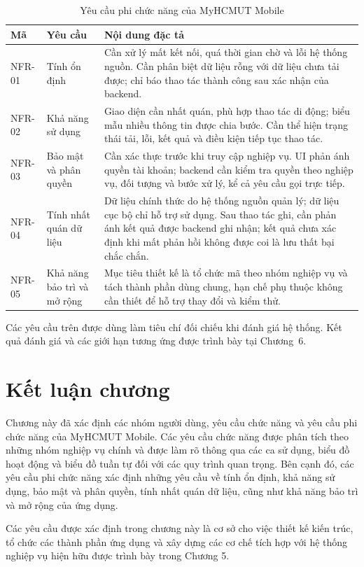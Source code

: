 \begin{table}[H]
\centering\small
\caption{Yêu cầu phi chức năng của MyHCMUT Mobile}
\label{tab:nfr}
\begin{tabularx}{\textwidth}{|L{1.8cm}|L{3.4cm}|Y|}
\hline
\textbf{Mã} & \textbf{Yêu cầu} & \textbf{Nội dung đặc tả} \\
\hline
NFR-01 & Tính ổn định & Cần xử lý mất kết nối, quá thời gian chờ và lỗi hệ thống nguồn. Cần phân biệt dữ liệu rỗng với dữ liệu chưa tải được; chỉ báo thao tác thành công sau xác nhận của backend. \\
\hline
NFR-02 & Khả năng sử dụng & Giao diện cần nhất quán, phù hợp thao tác di động; biểu mẫu nhiều thông tin được chia bước. Cần thể hiện trạng thái tải, lỗi, kết quả và điều kiện tiếp tục thao tác. \\
\hline
NFR-03 & Bảo mật và phân quyền & Cần xác thực trước khi truy cập nghiệp vụ. UI phản ánh quyền tài khoản; backend cần kiểm tra quyền theo nghiệp vụ, đối tượng và bước xử lý, kể cả yêu cầu gọi trực tiếp. \\
\hline
NFR-04 & Tính nhất quán dữ liệu & Dữ liệu chính thức do hệ thống nguồn quản lý; dữ liệu cục bộ chỉ hỗ trợ sử dụng. Sau thao tác ghi, cần phản ánh kết quả được backend ghi nhận; kết quả chưa xác định khi mất phản hồi không được coi là lưu thất bại chắc chắn. \\
\hline
NFR-05 & Khả năng bảo trì và mở rộng & Mục tiêu thiết kế là tổ chức mã theo nhóm nghiệp vụ và tách thành phần dùng chung, hạn chế phụ thuộc không cần thiết để hỗ trợ thay đổi và kiểm thử. \\
\hline
\end{tabularx}
\end{table}

Các yêu cầu trên được dùng làm tiêu chí đối chiếu khi đánh giá hệ thống. Kết quả đánh giá và các giới hạn tương ứng được trình bày tại Chương~6.

\section{Kết luận chương}
\label{sec:ketluan_chuong4}

Chương này đã xác định các nhóm người dùng, yêu cầu chức năng và yêu cầu phi chức năng của MyHCMUT Mobile. Các yêu cầu chức năng được phân tích theo những nhóm nghiệp vụ chính và được làm rõ thông qua các ca sử dụng, biểu đồ hoạt động và biểu đồ tuần tự đối với các quy trình quan trọng. Bên cạnh đó, các yêu cầu phi chức năng xác định những yêu cầu về tính ổn định, khả năng sử dụng, bảo mật và phân quyền, tính nhất quán dữ liệu, cũng như khả năng bảo trì và mở rộng của ứng dụng.

Các yêu cầu được xác định trong chương này là cơ sở cho việc thiết kế kiến trúc, tổ chức các thành phần ứng dụng và xây dựng các cơ chế tích hợp với hệ thống nghiệp vụ hiện hữu được trình bày trong Chương 5.
